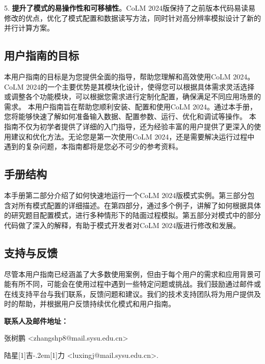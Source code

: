 5. \textbf{提升了模式的易操作性和可移植性}。CoLM 2024版保持了之前版本代码易读易修改的优点，优化了模式配置和数据读写方法，同时针对高分辨率模拟设计了新的并行计算方案。

\subsection{用户指南的目标}

本用户指南的目标是为您提供全面的指导，帮助您理解和高效使用CoLM 2024。CoLM 2024的一个主要优势是其模块化设计，使得您可以根据具体需求灵活选择或调整各个功能模块，可以根据您需求进行定制化配置，确保满足不同应用场景的需求。
本用户指南旨在帮助您顺利安装、配置和使用CoLM 2024。通过本手册，您将能够快速了解如何准备输入数据、配置参数、运行、优化和调试等操作。
本指南不仅为初学者提供了详细的入门指导，还为经验丰富的用户提供了更深入的使用建议和优化方法。无论您是第一次使用CoLM 2024，还是需要解决运行过程中遇到的复杂问题，本指南都将是您必不可少的参考资料。

\subsection{手册结构}

本手册第二部分介绍了如何快速地运行一个CoLM 2024版模式实例。第三部分包含对所有模式配置的详细描述。在第四部分，通过多个例子，讲解了如何根据具体的研究题目配置模式，进行多种情形下的陆面过程模拟。第五部分对模式中的部分代码做了深入的解释，有助于模式开发者对CoLM 2024版进行修改和发展。

\subsection{支持与反馈}

尽管本用户指南已经涵盖了大多数使用案例，但由于每个用户的需求和应用背景可能有所不同，可能会在使用过程中遇到一些特定问题或挑战。我们鼓励通过邮件或在线支持平台与我们联系，反馈问题和建议。我们的技术支持团队将为用户提供及时的帮助，并根据用户反馈持续优化模式和用户指南。

\textbf{联系人及邮件地址：}

张树鹏 <zhangshp8@mail.sysu.edu.cn>

陆星\hbox{\scalebox{0.6}[1]{吉}\kern-.2em\scalebox{0.6}[1]{力}} <luxingj@mail.sysu.edu.cn>.


\clearpage
